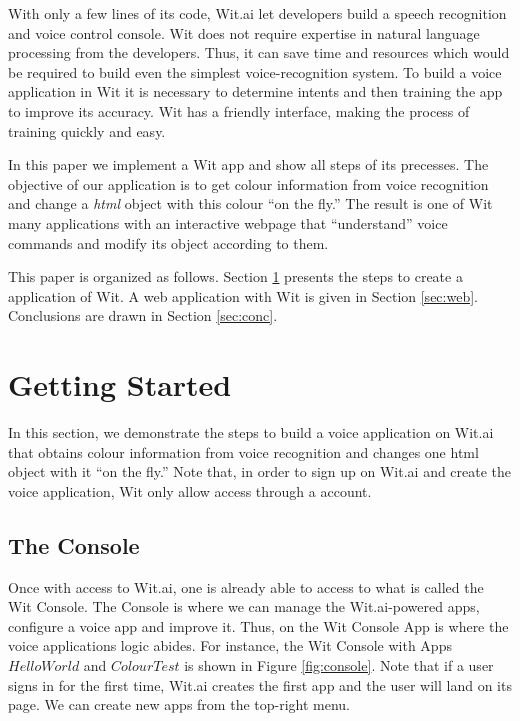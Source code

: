 \documentclass[twoside,11pt]{article}
\begin{document}
With only a few lines of its code, Wit.ai let developers build a speech recognition and voice control console.
Wit does not require expertise in natural language processing from the developers.
Thus, it can save time and resources which would be required to build even the simplest voice-recognition system.
To build a voice application in Wit it is necessary to determine intents and then training the app to improve its accuracy.
Wit has a friendly interface, making the process of training quickly and easy.

In this paper we implement a Wit app and show all steps of its precesses.
The objective of our application is to get colour information from voice recognition and change a \emph{html} object with this colour ``on the fly.''
The result is one of Wit many applications with an interactive webpage that ``understand'' voice commands and modify its object according to them.


This paper is organized as follows.
Section \ref{sec:get} presents the steps to create a application of Wit.
A web application with Wit is given in Section \ref{sec:web}.
Conclusions are drawn in Section \ref{sec:conc}.

\section{Getting Started}
\label{sec:get}


In this section, we demonstrate the steps to build a voice application on Wit.ai that obtains colour information from voice recognition and changes one html object with it ``on the fly.''
Note that, in order to sign up on Wit.ai and create the voice application, Wit only allow access through a \cite{github_2016} account.


\subsection{The Console}

Once with access to Wit.ai, one is already able to access to what is called the Wit Console. 
The Console is where we can manage the Wit.ai-powered apps, configure a voice app and improve it.
Thus, on the Wit Console App is where the voice applications logic abides.
For instance, the Wit Console with Apps $HelloWorld$ and $ColourTest$ is shown in Figure \ref{fig:console}.
Note that if a user signs in for the first time, Wit.ai creates the first app and the user will land on its page.
We can create new apps from the top-right menu.
\end{document}
